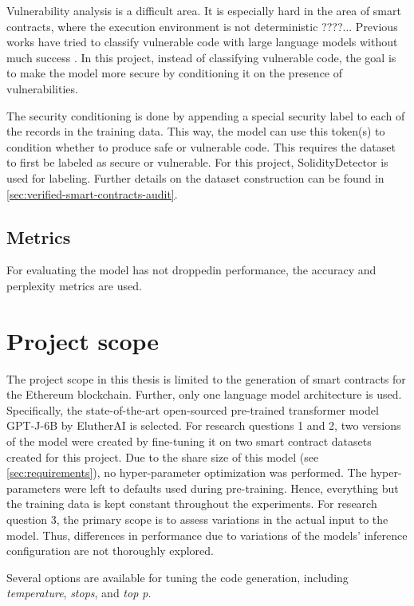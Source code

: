 Vulnerability analysis is a difficult area. It is especially hard in the area of smart contracts, where the execution environment is not deterministic ????... Previous works have tried to classify vulnerable code with large language models without much success . In this project, instead of classifying vulnerable code, the goal is to make the model more secure by conditioning it on the presence of vulnerabilities.

The security conditioning is done by appending a special security label to each of the records in the training data. This way, the model can use this token(s) to condition whether to produce safe or vulnerable code. This requires the dataset to first be labeled as secure or vulnerable. For this project, SolidityDetector is used for labeling. Further details on the dataset construction can be found in \cref{sec:verified-smart-contracts-audit}.

\subsection{Metrics}
For evaluating the model has not droppedin performance, the  accuracy and perplexity  metrics are used. 

\section{Project scope}
\label{sec:project-scope}

The project scope in this thesis is limited to the generation of smart contracts for the Ethereum blockchain. Further, only one language model architecture is used. Specifically, the state-of-the-art open-sourced pre-trained transformer model GPT-J-6B by ElutherAI is selected. For research questions 1 and 2, two versions of the model were created by fine-tuning it on two smart contract datasets created for this project. Due to the share size of this model (see \cref{sec:requirements}), no hyper-parameter optimization was performed. The hyper-parameters were left to defaults used during pre-training. Hence, everything but the training data is kept constant throughout the experiments. For research question 3, the primary scope is to assess variations in the actual input to the model. Thus, differences in performance due to variations of the models' inference configuration are not thoroughly explored.

Several options are available for tuning the code generation, including \textit{temperature}, \textit{stops}, and \textit{top p}.

